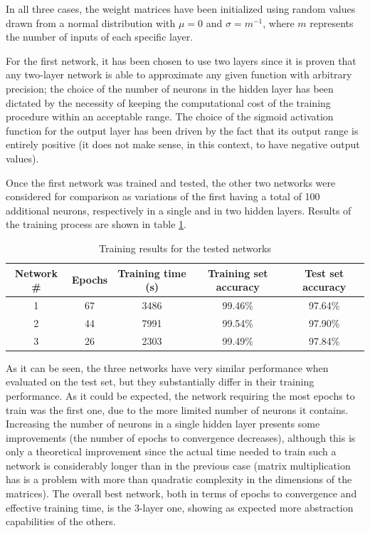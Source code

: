 \documentclass[letterpaper,headings=standardclasses]{scrartcl}
\begin{document}
In all three cases, the weight matrices have been initialized using random values drawn from a normal distribution with $\mu = 0$ and $\sigma = m^{-1}$, where $m$ represents the number of inputs of each specific layer.

For the first network, it has been chosen to use two layers since it is proven that any two-layer network is able to approximate any given function with arbitrary precision; the choice of the number of neurons in the hidden layer has been dictated by the necessity of keeping the computational cost of the training procedure within an acceptable range. The choice of the sigmoid activation function for the output layer has been driven by the fact that its output range is entirely positive (it does not make sense, in this context, to have negative output values).

Once the first network was trained and tested, the other two networks were considered for comparison as variations of the first having a total of 100 additional neurons, respectively in a single and in two hidden layers. Results of the training process are shown in table \ref{net_results}.

\begin{table}[h]
    \centering
    \begin{tabular}{|c|c|c|c|c|}
    \hline
    Network \# & Epochs & Training time (s) & Training set accuracy & Test set accuracy \\ \hline
    1 & 67 & 3486 & 99.46\% & 97.64\% \\ \hline
    2 & 44 & 7991 & 99.54\% & 97.90\% \\ \hline
    3 & 26 & 2303 & 99.49\% & 97.84\% \\ \hline
    \end{tabular}
    \caption{Training results for the tested networks}
    \label{net_results}
\end{table}

As it can be seen, the three networks have very similar performance when evaluated on the test set, but they substantially differ in their training performance. As it could be expected, the network requiring the most epochs to train was the first one, due to the more limited number of neurons it contains. Increasing the number of neurons in a single hidden layer presents some improvements (the number of epochs to convergence decreases), although this is only a theoretical improvement since the actual time needed to train such a network is considerably longer than in the previous case (matrix multiplication has is a problem with more than quadratic complexity in the dimensions of the matrices). The overall best network, both in terms of epochs to convergence and effective training time, is the 3-layer one, showing as expected more abstraction capabilities of the others.
\end{document}

